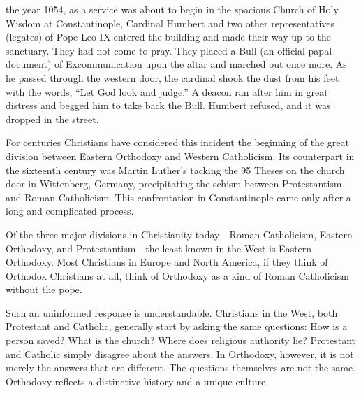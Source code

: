
 the year 1054, as a service was about to begin in the spacious
Church of Holy Wisdom at Constantinople, Cardinal Humbert and two other representatives (legates) of
Pope Leo IX entered the building and made their way up to the sanctuary. They had not come to pray.
They placed a Bull (an official papal document) of Excommunication upon the altar and marched out
once more. As he passed through the western door, the cardinal shook the dust from his feet with the
words, “Let God look and judge.” A deacon ran after him in great distress and begged him to take
back the Bull. Humbert refused, and it was dropped in the street.

For centuries Christians have considered this incident the beginning of the great division between
Eastern Orthodoxy and Western Catholicism. Its counterpart in the sixteenth century was Martin
Luther’s tacking the 95 Theses on the church door in Wittenberg, Germany, precipitating the schism
between Protestantism and Roman Catholicism. This confrontation in Constantinople came only after a
long and complicated process.

Of the three major divisions in Christianity today—Roman Catholicism, Eastern Orthodoxy, and
Protestantism—the least known in the West is Eastern Orthodoxy. Most Christians in Europe and North
America, if they think of Orthodox Christians at all, think of Orthodoxy as a kind of Roman
Catholicism without the pope.

Such an uninformed response is understandable. Christians in the West, both Protestant and Catholic,
generally start by asking the same questions: How is a person saved? What is the church? Where does
religious authority lie? Protestant and Catholic simply disagree about the answers. In Orthodoxy,
however, it is not merely the answers that are different. The questions themselves are not the same.
Orthodoxy reflects a distinctive history and a unique culture.

